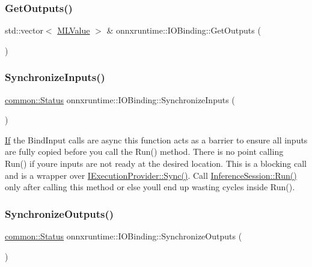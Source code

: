 \subsubsection{\texorpdfstring{Get\+Outputs()}{GetOutputs()}}
{\footnotesize\ttfamily std\+::vector$<$ \mbox{\hyperlink{classonnxruntime_1_1MLValue}{M\+L\+Value}} $>$ \& onnxruntime\+::\+I\+O\+Binding\+::\+Get\+Outputs (\begin{DoxyParamCaption}{ }\end{DoxyParamCaption})}

\mbox{\label{classonnxruntime_1_1IOBinding_a03022da7eb066502cae7288f13ef1625}} 
\subsubsection{\texorpdfstring{Synchronize\+Inputs()}{SynchronizeInputs()}}
{\footnotesize\ttfamily \mbox{\hyperlink{classonnxruntime_1_1common_1_1Status}{common\+::\+Status}} onnxruntime\+::\+I\+O\+Binding\+::\+Synchronize\+Inputs (\begin{DoxyParamCaption}{ }\end{DoxyParamCaption})}

\mbox{\hyperlink{classonnxruntime_1_1If}{If}} the Bind\+Input calls are async this function acts as a barrier to ensure all inputs are fully copied before you call the Run() method. There is no point calling Run() if you\textquotesingle{}re inputs are not ready at the desired location. This is a blocking call and is a wrapper over \mbox{\hyperlink{classonnxruntime_1_1IExecutionProvider_a3657d5ed274547507a7b99d466fa13ef}{I\+Execution\+Provider\+::\+Sync()}}. Call \mbox{\hyperlink{classonnxruntime_1_1InferenceSession_a90aa8b5fdc2638c4d2c45afc9c3ed222}{Inference\+Session\+::\+Run()}} only after calling this method or else you\textquotesingle{}ll end up wasting cycles inside Run(). \mbox{\label{classonnxruntime_1_1IOBinding_a2d4ea18ada1b7227d9fd73a4576713f8}} 
\subsubsection{\texorpdfstring{Synchronize\+Outputs()}{SynchronizeOutputs()}}
{\footnotesize\ttfamily \mbox{\hyperlink{classonnxruntime_1_1common_1_1Status}{common\+::\+Status}} onnxruntime\+::\+I\+O\+Binding\+::\+Synchronize\+Outputs (\begin{DoxyParamCaption}{ }\end{DoxyParamCaption})}



